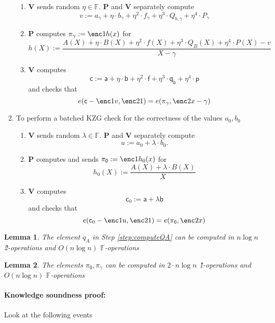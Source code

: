 \documentclass[11pt]{article} %
\newcommand{\F}{\ensuremath{\mathbb F}\xspace}
\newcommand{\defeq}{:=}
\newcommand{\prv}{\ensuremath{\mathsf{\mathbf{P}}}\xspace}
\newcommand{\ver}{\ensuremath{\mathsf{\mathbf{V}}}\xspace}
\newtheorem{lemma}{Lemma}[section]
\newcommand{\witsize}{\ensuremath{n}\xspace}
\newcommand{\witruntime}{\ensuremath{\witsize\log\witsize}\xspace}
\renewcommand{\a}{\ensuremath{\mathsf{a}}\xspace}
\renewcommand{\b}{\ensuremath{\mathsf{b}}\xspace}
\renewcommand{\c}{\ensuremath{\mathsf{c}}\xspace}
\newcommand{\f}{\ensuremath{\mathsf{f}}\xspace}
\renewcommand{\p}{\ensuremath{\mathsf{p}}\xspace}
\newcommand{\qb}{\ensuremath{\mathsf{q_b}}\xspace}
\newcommand{\agam}{\ensuremath{a_\gamma}\xspace}
\newcommand{\gamproof}{\ensuremath{\mathsf{\pi_\gamma}}\xspace}
\newcommand{\zerproof}{\ensuremath{\mathsf{\pi_0}}\xspace}
\newcommand{\bgam}{\ensuremath{b_\gamma}\xspace}
\newcommand{\qbgam}{\ensuremath{Q_{b,\gamma}}\xspace}
\newcommand{\fgam}{\ensuremath{f_{\gamma}}\xspace}
\newcommand{\pgam}{\ensuremath{P_{\gamma}}\xspace}
\begin{document}
\begin{enumerate}
  \begin{enumerate}
   \item \ver sends random $\eta\in \F$. \prv and \ver separately compute
   \[v\defeq \agam+\eta\cdot \bgam +\eta^2\cdot\fgam + \eta^3\cdot \qbgam + \eta^4\cdot \pgam\]
   \item \prv computes $\gamproof\defeq \enc1{h(x)}$ for 
   \[h(X)\defeq \frac{A(X)+\eta\cdot B(X)+ \eta^2\cdot f(X) + \eta^3\cdot Q_B(X) + \eta^4\cdot P(X) -v}{X-\gamma}\]
   \item \ver computes 
   \[\c\defeq \a+\eta\cdot \b+\eta^2\cdot \f +\eta^3\cdot \qb + \eta^4\cdot \p\]
   and  checks that 
   \[e(\c-\enc1{v},\enc2{1})=e(\gamproof,\enc2{x-\gamma})\]
  \end{enumerate}
\item To perform a batched KZG check for the correctness of the values  $a_0,b_0$
  \begin{enumerate}
   \item \ver sends random $\lambda\in \F$. \prv and \ver separately compute
   \[u\defeq a_0+\lambda \cdot b_0.\] 
   \item \prv computes and sends $\zerproof\defeq \enc1{h_0(x)}$ for 
   \[h_0(X)\defeq \frac{A(X)+\lambda\cdot B(X)}{X}\]
   \item \ver computes 
   \[\c_0 \defeq \a +\lambda \b\]
   and  checks that 
   \[e(\c_0-\enc1{u},\enc2{1})=e(\zerproof,\enc2{x})\]
  \end{enumerate}

\end{enumerate}



\begin{lemma}\label{lem:computeQA}
The element $q_A$ in Step \ref{step:computeQA} can be computed in  \witruntime \G2-operations and $O(\witruntime)$ \F-operations
\end{lemma}
\begin{lemma}\label{lem:computeKZGproofs}
The elements $\zerproof,\gamproof$ can be computed in  $2\cdot\witruntime$ \G1-operations and $O(\witruntime)$ \F-operations
\end{lemma}

\paragraph{Knowledge soundness proof:}

Look at the following events 


\end{document}
